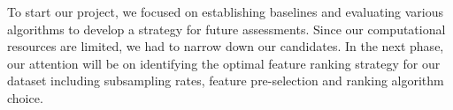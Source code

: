 \documentclass[fleqn,moreauthors,10pt]{ds_report}
\begin{document}
To start our project, we focused on establishing baselines and evaluating various algorithms to develop a strategy for future assessments. Since our computational resources are limited, we had to narrow down our candidates. In the next phase, our attention will be on identifying the optimal feature ranking strategy for our dataset including subsampling rates, feature pre-selection and ranking algorithm choice.








\end{document}
